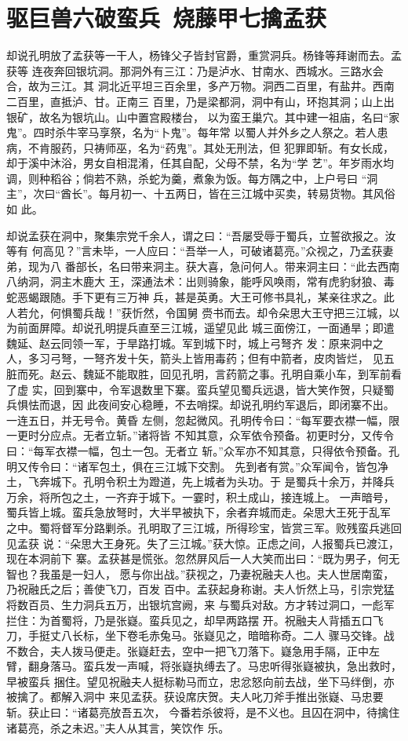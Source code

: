 \chapter{驱巨兽六破蛮兵~烧藤甲七擒孟获}

却说孔明放了孟获等一干人，杨锋父子皆封官爵，重赏洞兵。杨锋等拜谢而去。孟获等
连夜奔回银坑洞。那洞外有三江：乃是泸水、甘南水、西城水。三路水会合，故为三江。其
洞北近平坦三百余里，多产万物。洞西二百里，有盐井。西南二百里，直抵泸、甘。正南三
百里，乃是梁都洞，洞中有山，环抱其洞；山上出银矿，故名为银坑山。山中置宫殿楼台，
以为蛮王巢穴。其中建一祖庙，名曰“家鬼”。四时杀牛宰马享祭，名为“卜鬼”。每年常
以蜀人并外乡之人祭之。若人患病，不肯服药，只祷师巫，名为“药鬼”。其处无刑法，但
犯罪即斩。有女长成，却于溪中沐浴，男女自相混淆，任其自配，父母不禁，名为“学
艺”。年岁雨水均调，则种稻谷；倘若不熟，杀蛇为羹，煮象为饭。每方隅之中，上户号曰
“洞主”，次曰“酋长”。每月初一、十五两日，皆在三江城中买卖，转易货物。其风俗如
此。

却说孟获在洞中，聚集宗党千余人，谓之曰：“吾屡受辱于蜀兵，立誓欲报之。汝等有
何高见？”言未毕，一人应曰：“吾举一人，可破诸葛亮。”众视之，乃孟获妻弟，现为八
番部长，名曰带来洞主。获大喜，急问何人。带来洞主曰：“此去西南八纳洞，洞主木鹿大
王，深通法术：出则骑象，能呼风唤雨，常有虎豹豺狼、毒蛇恶蝎跟随。手下更有三万神
兵，甚是英勇。大王可修书具礼，某亲往求之。此人若允，何惧蜀兵哉！”获忻然，令国舅
赍书而去。却令朵思大王守把三江城，以为前面屏障。却说孔明提兵直至三江城，遥望见此
城三面傍江，一面通旱；即遣魏延、赵云同领一军，于旱路打城。军到城下时，城上弓弩齐
发：原来洞中之人，多习弓弩，一弩齐发十矢，箭头上皆用毒药；但有中箭者，皮肉皆烂，
见五脏而死。赵云、魏延不能取胜，回见孔明，言药箭之事。孔明自乘小车，到军前看了虚
实，回到寨中，令军退数里下寨。蛮兵望见蜀兵远退，皆大笑作贺，只疑蜀兵惧怯而退，因
此夜间安心稳睡，不去哨探。却说孔明约军退后，即闭寨不出。一连五日，并无号令。黄昏
左侧，忽起微风。孔明传令曰：“每军要衣襟一幅，限一更时分应点。无者立斩。”诸将皆
不知其意，众军依令预备。初更时分，又传令曰：“每军衣襟一幅，包土一包。无者立
斩。”众军亦不知其意，只得依令预备。孔明又传令曰：“诸军包土，俱在三江城下交割。
先到者有赏。”众军闻令，皆包净土，飞奔城下。孔明令积土为蹬道，先上城者为头功。于
是蜀兵十余万，并降兵万余，将所包之土，一齐弃于城下。一霎时，积土成山，接连城上。
一声暗号，蜀兵皆上城。蛮兵急放弩时，大半早被执下，余者弃城而走。朵思大王死于乱军
之中。蜀将督军分路剿杀。孔明取了三江城，所得珍宝，皆赏三军。败残蛮兵逃回见孟获
说：“朵思大王身死。失了三江城。”获大惊。正虑之间，人报蜀兵已渡江，现在本洞前下
寨。孟获甚是慌张。忽然屏风后一人大笑而出曰：“既为男子，何无智也？我虽是一妇人，
愿与你出战。”获视之，乃妻祝融夫人也。夫人世居南蛮，乃祝融氏之后；善使飞刀，百发
百中。孟获起身称谢。夫人忻然上马，引宗党猛将数百员、生力洞兵五万，出银坑宫阙，来
与蜀兵对敌。方才转过洞口，一彪军拦住：为首蜀将，乃是张嶷。蛮兵见之，却早两路摆
开。祝融夫人背插五口飞刀，手挺丈八长标，坐下卷毛赤兔马。张嶷见之，暗暗称奇。二人
骤马交锋。战不数合，夫人拨马便走。张嶷赶去，空中一把飞刀落下。嶷急用手隔，正中左
臂，翻身落马。蛮兵发一声喊，将张嶷执缚去了。马忠听得张嶷被执，急出救时，早被蛮兵
捆住。望见祝融夫人挺标勒马而立，忠忿怒向前去战，坐下马绊倒，亦被擒了。都解入洞中
来见孟获。获设席庆贺。夫人叱刀斧手推出张嶷、马忠要斩。获止曰：“诸葛亮放吾五次，
今番若杀彼将，是不义也。且囚在洞中，待擒住诸葛亮，杀之未迟。”夫人从其言，笑饮作
乐。

